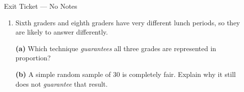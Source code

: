 \documentclass[10pt]{article}
\begin{document}
\begin{notesbox}{Exit Ticket --- No Notes}
\begin{enumerate}[leftmargin=1.6em, itemsep=9pt, topsep=3pt]
  \item Sixth graders and eighth graders have very different lunch periods, so
        they are likely to answer differently.

        \textbf{(a)} Which technique \emph{guarantees} all three grades are
        represented in proportion? 

        \textbf{(b)} A simple random sample of $30$ is completely fair. Explain
        why it still does not \emph{guarantee} that result.

\end{enumerate}
\end{notesbox}
\end{document}
